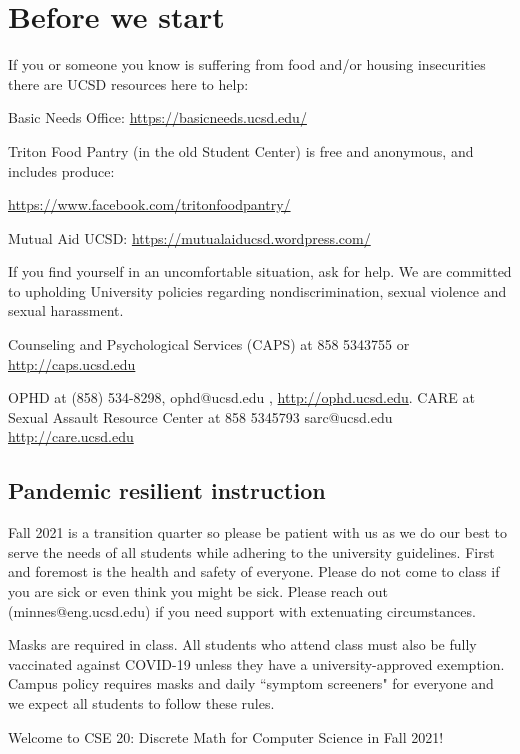 

\section*{Before we start}
If you or someone you know is suffering from food and/or housing insecurities 
there are UCSD resources here to help:

Basic Needs Office: \href{https://basicneeds.ucsd.edu/}{https://basicneeds.ucsd.edu/}

Triton Food Pantry (in the old Student Center)
is free and anonymous, and includes produce: 

\href{https://www.facebook.com/tritonfoodpantry/}{https://www.facebook.com/tritonfoodpantry/}

Mutual Aid UCSD: \href{https://mutualaiducsd.wordpress.com/}{https://mutualaiducsd.wordpress.com/}

If you find yourself in an uncomfortable situation, ask for help. 
We are committed to upholding University policies regarding nondiscrimination, sexual violence and sexual harassment.

Counseling and Psychological Services (CAPS) at 858 5343755 or \href{http://caps.ucsd.edu}{http://caps.ucsd.edu}


OPHD at (858) 534-8298, ophd@ucsd.edu , \href{http://ophd.ucsd.edu}{http://ophd.ucsd.edu}. 
CARE at Sexual Assault Resource Center at 858 5345793 sarc@ucsd.edu \href{http://care.ucsd.edu}{http://care.ucsd.edu}

\subsection*{Pandemic resilient instruction}
Fall 2021 is a transition quarter so please be patient with us as we do our best 
to serve the needs of all students while adhering to the university guidelines. 
First and foremost is the health and safety of everyone.  
Please do not come to class if you are sick or even think you might be sick.
Please reach out (minnes@eng.ucsd.edu) if you need support with extenuating circumstances.

Masks are required in class. All students who attend class must also be fully vaccinated against COVID-19
unless they have a university-approved exemption.
Campus policy requires masks and daily ``symptom screeners" for everyone and we expect all students 
to follow these rules. 


\newpage
Welcome to CSE 20: Discrete Math for Computer Science in Fall 2021! 

